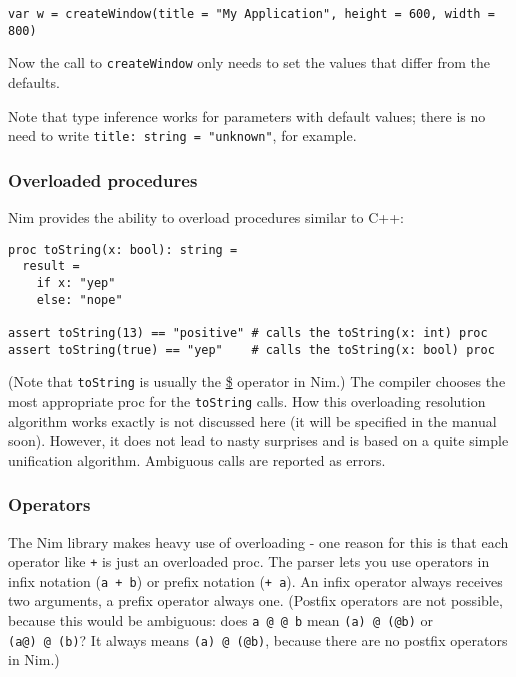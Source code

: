 \begin{verbatim}
var w = createWindow(title = "My Application", height = 600, width = 800)
\end{verbatim}

Now the call to \texttt{createWindow} only needs to set the values that
differ from the defaults.

Note that type inference works for parameters with default values; there
is no need to write \texttt{title:\ string\ =\ "unknown"}, for example.

\hypertarget{overloaded-procedures}{%
\subsubsection{Overloaded procedures}\label{overloaded-procedures}}

Nim provides the ability to overload procedures similar to C++:

\begin{verbatim}
proc toString(x: bool): string =
  result =
    if x: "yep"
    else: "nope"

assert toString(13) == "positive" # calls the toString(x: int) proc
assert toString(true) == "yep"    # calls the toString(x: bool) proc
\end{verbatim}

(Note that \texttt{toString} is usually the \href{dollars.html}{\$}
operator in Nim.) The compiler chooses the most appropriate proc for the
\texttt{toString} calls. How this overloading resolution algorithm works
exactly is not discussed here (it will be specified in the manual soon).
However, it does not lead to nasty surprises and is based on a quite
simple unification algorithm. Ambiguous calls are reported as errors.

\hypertarget{operators}{%
\subsubsection{Operators}\label{operators}}

The Nim library makes heavy use of overloading - one reason for this is
that each operator like \texttt{+} is just an overloaded proc. The
parser lets you use operators in {infix notation} (\texttt{a\ +\ b}) or
{prefix notation} (\texttt{+\ a}). An infix operator always receives two
arguments, a prefix operator always one. (Postfix operators are not
possible, because this would be ambiguous: does \texttt{a\ @\ @\ b} mean
\texttt{(a)\ @\ (@b)} or \texttt{(a@)\ @\ (b)}? It always means
\texttt{(a)\ @\ (@b)}, because there are no postfix operators in Nim.)

